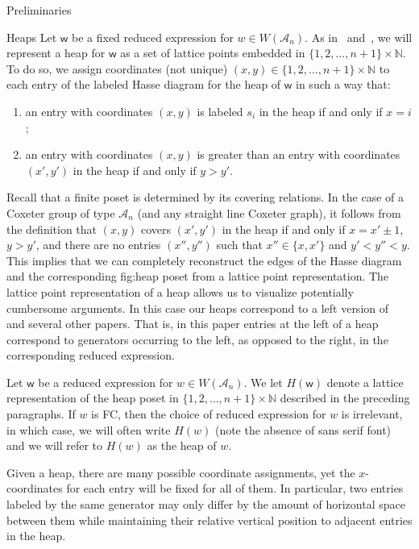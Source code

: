 \documentclass[11pt]{amsart}
\theoremstyle{definition}
\numberwithin{equation}{section}
\newcommand{\N}{\mathbb{N}}
\newcommand{\A}{\mathcal{A}}
\renewcommand{\(}{\left(}
\renewcommand{\)}{\right)}
\newcommand{\w}{\mathsf{w}}
\begin{document}
\begin{section}{Preliminaries}
\begin{subsection}{Heaps}
Let $\w$ be a fixed reduced expression for $w \in W(\A_{n})$.  As in~\cite{Billey2007} and~\cite{Ernst2010}, we will represent a heap for $\w$ as a set of lattice points embedded in $\{1,2,\ldots,n+1\} \times \mathbb{N}$.  To do so, we assign coordinates (not unique) $(x,y) \in \{1,2,\ldots, n+1\} \times \mathbb{N}$ to each entry of the labeled Hasse diagram for the heap of $\w$ in such a way that:
\begin{enumerate}
\item an entry with coordinates $(x,y)$ is labeled $s_i$ in the heap if and only if $x = i$; 
\item an entry with coordinates $(x,y)$ is greater than an entry with coordinates $(x',y')$ in the heap if and only if $y > y'$.
\end{enumerate}
Recall that a finite poset is determined by its covering relations.  In the case of a Coxeter group of type $\A_{n}$ (and any straight line Coxeter graph), it follows from the definition that $(x,y)$ covers $(x',y')$ in the heap if and only if $x = x' \pm 1$, $y > y'$, and there are no entries $(x'', y'')$ such that $x'' \in \{x, x'\}$ and $y'< y'' < y$.  This implies that we can completely reconstruct the edges of the Hasse diagram and the corresponding fig:heap poset from a lattice point representation. The lattice point representation of a heap allows us to visualize potentially cumbersome arguments.  In this case our heaps correspond to a left version of~\cite{Billey2007} and several other papers.  That is, in this paper entries at the left of a heap correspond to generators occurring to the left, as opposed to the right, in the corresponding reduced expression. 

Let $\w$ be a reduced expression for $w \in W(\A_{n})$.  We let $H(\w)$ denote a lattice representation of the heap poset in $\{1,2,\ldots,n+1\} \times \N$ described in the preceding paragraphs.  If $w$ is FC, then the choice of reduced expression for $w$ is irrelevant, in which case, we will often write $H(w)$ (note the absence of \textsf{sans serif} font) and we will refer to $H(w)$ as the heap of $w$.

Given a heap, there are many possible coordinate assignments, yet the $x$-coordinates for each entry will be fixed for all of them.  In particular, two entries labeled by the same generator may only differ by the amount of horizontal space between them while maintaining their relative vertical position to adjacent entries in the heap.


\end{subsection}
\end{section}
\end{document}
